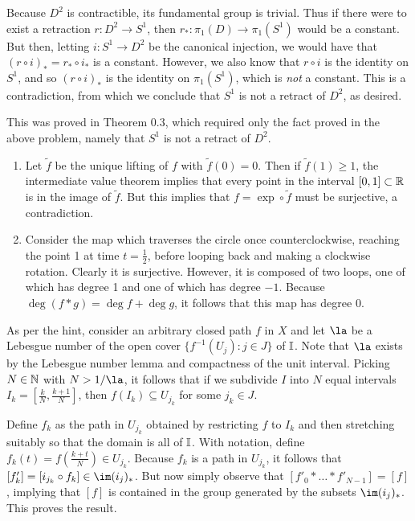 \documentclass[../../solutions.tex]{subfiles}
\begin{document}
\begin{exercise} \leavevmode
Because $D^2$ is contractible, its fundamental group is trivial. 
Thus if there were to exist a retraction $r:D^2\to S^1$, then $r_*:\pi_1(D)\to\pi_1(S^1)$ would be a constant. 
But then, letting $i:S^1\to D^2$ be the canonical injection, we would have that $(r\circ i)_*=r_*\circ i_*$ is a constant. 
However, we also know that $r\circ i$ is the identity on $S^1$, and so $(r\circ i)_*$ is the identity on $\pi_1(S^1)$, which is \textit{not} a constant. 
This is a contradiction, from which we conclude that $S^1$ is not a retract of $D^2$, as desired. 
\end{exercise}

\begin{exercise} \leavevmode
This was proved in Theorem 0.3, which required only the fact proved in the above problem, namely that $S^1$ is not a retract of $D^2$. 
\end{exercise}

\begin{exercise} \leavevmode
\begin{enumerate}
\item Let $\tilde f$ be the unique lifting of $f$ with $\tilde f(0)=0$. 
Then if $\tilde f(1)\ge1$, the intermediate value theorem implies that every point in the interval $[0,1]\subset\mathbb{R}$ is in the image of $\tilde f$. 
But this implies that $f=\exp\circ\tilde f$ must be surjective, a contradiction. 

\item Consider the map which traverses the circle once counterclockwise, reaching the point 1 at time $t=\frac12$, before looping back and making a clockwise rotation. 
Clearly it is surjective. 
However, it is composed of two loops, one of which has degree 1 and one of which has degree $-1$. 
Because $\deg(f*g)=\deg f+\deg g$, it follows that this map has degree 0. 
\end{enumerate}
\end{exercise}

\begin{exercise} \leavevmode
As per the hint, consider an arbitrary closed path $f$ in $X$ and let $\la$ be a Lebesgue number of the open cover $\{f^{-1}(U_j):j\in J\}$ of $\mathbb I$. 
Note that $\la$ exists by the Lebesgue number lemma and compactness of the unit interval. 
Picking $N\in\mathbb{N}$ with $N>1/\la$, it follows that if we subdivide $I$ into $N$ equal intervals $I_k=[\frac kN,\frac{k+1}N]$, then $f(I_k)\subseteq U_{j_k}$ for some $j_k\in J$. 

Define $f_k$ as the path in $U_{j_k}$ obtained by restricting $f$ to $I_k$ and then stretching suitably so that the domain is all of $\mathbb I$.
With notation, define $f_k(t)=f\left(\frac{k+t}N\right)\in U_{j_k}$.
Because $f_k$ is a path in $U_{j_k}$, it follows that $[f'_k]=[i_{j_k}\circ f_k]\in\im(i_j)_*$. But now simply observe that $[f'_0*\dots*f'_{N-1}]=[f]$, implying that $[f]$ is contained in the group generated by the subsets $\im(i_j)_*$. This proves the result. 
\end{exercise}
\end{document}
